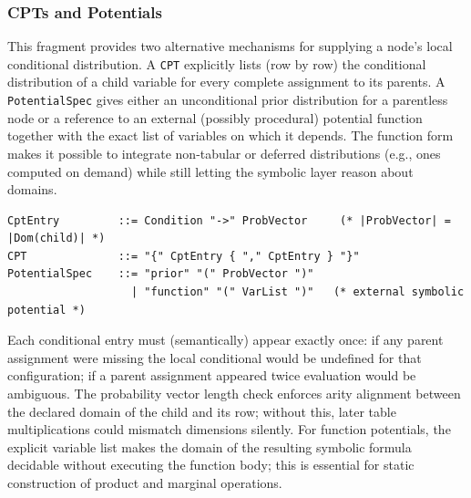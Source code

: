 \documentclass[11pt]{article}
\begin{document}
\subsubsection{CPTs and Potentials}
This fragment provides two alternative mechanisms for supplying a node's local conditional distribution. A \texttt{CPT} explicitly lists (row by row) the conditional distribution of a child variable for every complete assignment to its parents. A \texttt{PotentialSpec} gives either an unconditional prior distribution for a parentless node or a reference to an external (possibly procedural) potential function together with the exact list of variables on which it depends. The function form makes it possible to integrate non-tabular or deferred distributions (e.g., ones computed on demand) while still letting the symbolic layer reason about domains.
\begin{lstlisting}[language=EBNF]
CptEntry         ::= Condition "->" ProbVector     (* |ProbVector| = |Dom(child)| *)
CPT              ::= "{" CptEntry { "," CptEntry } "}"
PotentialSpec    ::= "prior" "(" ProbVector ")"
				   | "function" "(" VarList ")"   (* external symbolic potential *)
\end{lstlisting}
Each conditional entry must (semantically) appear exactly once: if any parent assignment were missing the local conditional would be undefined for that configuration; if a parent assignment appeared twice evaluation would be ambiguous. The probability vector length check enforces arity alignment between the declared domain of the child and its row; without this, later table multiplications could mismatch dimensions silently. For function potentials, the explicit variable list makes the domain of the resulting symbolic formula decidable without executing the function body; this is essential for static construction of product and marginal operations.
\end{document}
